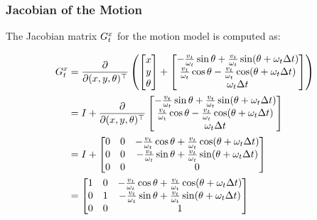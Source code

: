 \begin{frame}
    \frametitle{Jacobian of the Motion}
    
    The Jacobian matrix $G_{t}^{x}$ for the motion model is computed as:
    
    \begin{align*}
        G_{t}^{x} &= \frac{\partial}{\partial(x, y, \theta)^{\top}} \left(
        \begin{bmatrix}
        x \\
        y \\
        \theta
        \end{bmatrix}
        +
        \begin{bmatrix}
        -\frac{v_t}{\omega_t} \sin \theta + \frac{v_t}{\omega_t} \sin(\theta + \omega_t \Delta t) \\
        \frac{v_t}{\omega_t} \cos \theta - \frac{v_t}{\omega_t} \cos(\theta + \omega_t \Delta t) \\
        \omega_t \Delta t
        \end{bmatrix}
        \right) \\
        &= I + \frac{\partial}{\partial(x, y, \theta)^{\top}} 
        \begin{bmatrix}
        -\frac{v_t}{\omega_t} \sin \theta + \frac{v_t}{\omega_t} \sin(\theta + \omega_t \Delta t) \\
        \frac{v_t}{\omega_t} \cos \theta - \frac{v_t}{\omega_t} \cos(\theta + \omega_t \Delta t) \\
        \omega_t \Delta t
        \end{bmatrix} \\
        &= I + 
        \begin{bmatrix}
        0 & 0 & -\frac{v_t}{\omega_t} \cos \theta + \frac{v_t}{\omega_t} \cos(\theta + \omega_t \Delta t) \\
        0 & 0 & -\frac{v_t}{\omega_t} \sin \theta + \frac{v_t}{\omega_t} \sin(\theta + \omega_t \Delta t) \\
        0 & 0 & 0
        \end{bmatrix} \\
        &= 
        \begin{bmatrix}
        1 & 0 & -\frac{v_t}{\omega_t} \cos \theta + \frac{v_t}{\omega_t} \cos(\theta + \omega_t \Delta t) \\
        0 & 1 & -\frac{v_t}{\omega_t} \sin \theta + \frac{v_t}{\omega_t} \sin(\theta + \omega_t \Delta t) \\
        0 & 0 & 1
        \end{bmatrix}
    \end{align*}
    
\end{frame}

